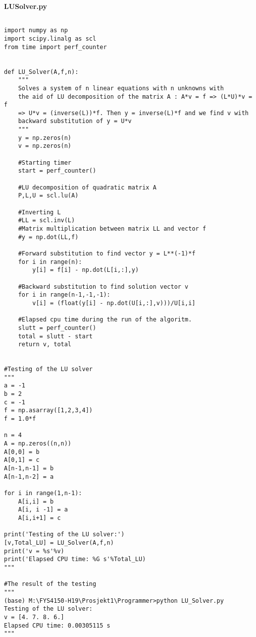 \documentclass[11pt]{article}
\begin{document}
\vspace{4mm}
\noindent
\textbf{LU\textunderscore Solver.py}

\begin{verbatim}

import numpy as np
import scipy.linalg as scl
from time import perf_counter


def LU_Solver(A,f,n):
    """
    Solves a system of n linear equations with n unknowns with
    the aid of LU decomposition of the matrix A : A*v = f => (L*U)*v = f
    => U*v = (inverse(L))*f. Then y = inverse(L)*f and we find v with
    backward substitution of y = U*v   
    """
    y = np.zeros(n)
    v = np.zeros(n)

    #Starting timer
    start = perf_counter()

    #LU decomposition of quadratic matrix A
    P,L,U = scl.lu(A)

    #Inverting L
    #LL = scl.inv(L)
    #Matrix multiplication between matrix LL and vector f
    #y = np.dot(LL,f)
	
    #Forward substitution to find vector y = L**(-1)*f
    for i in range(n):
        y[i] = f[i] - np.dot(L[i,:],y) 	

    #Backward substitution to find solution vector v
    for i in range(n-1,-1,-1):
        v[i] = (float(y[i] - np.dot(U[i,:],v)))/U[i,i]

    #Elapsed cpu time during the run of the algoritm.
    slutt = perf_counter()
    total = slutt - start
    return v, total


#Testing of the LU solver
"""
a = -1
b = 2
c = -1
f = np.asarray([1,2,3,4])
f = 1.0*f

n = 4
A = np.zeros((n,n))
A[0,0] = b
A[0,1] = c
A[n-1,n-1] = b
A[n-1,n-2] = a

for i in range(1,n-1):
    A[i,i] = b
    A[i, i -1] = a
    A[i,i+1] = c

print('Testing of the LU solver:')
[v,Total_LU] = LU_Solver(A,f,n)
print('v = %s'%v)
print('Elapsed CPU time: %G s'%Total_LU)
"""

#The result of the testing
"""
(base) M:\FYS4150-H19\Prosjekt1\Programmer>python LU_Solver.py
Testing of the LU solver:
v = [4. 7. 8. 6.]
Elapsed CPU time: 0.00305115 s
"""

\end{verbatim}
\end{document}
